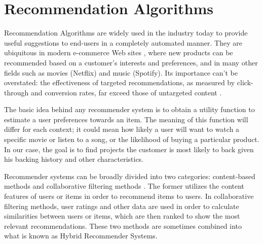 \documentclass[cic,tc,english]{iiufrgs}
\begin{document}



\chapter{Recommendation Algorithms}
Recommendation Algorithms are widely used in the industry today to provide useful suggestions to end-users in a completely automated manner. They are ubiquitous in modern e-commerce Web sites \cite{Schafer2001}, where new products can be recommended based on a customer's interests and preferences, and in many other fields such as movies (Netflix) and music (Spotify). Its importance can't be overstated: the effectiveness of targeted recommendations, as measured by click-through and conversion rates, far exceed those of untargeted content \cite{Linden2003}.

The basic idea behind any recommender system is to obtain a utility function to estimate a user preferences towards an item. The meaning of this function will differ for each context; it could mean how likely a user will want to watch a specific movie or listen to a song, or the likelihood of buying a particular product. In our case, the goal is to find projects the customer is most likely to back given his backing history and other characteristics. 

Recommender systems can be broadly divided into two categories: content-based methods and collaborative filtering methods \cite{Rakesh2016}.
The former utilizes the content features of users or items in order to recommend items to users. In collaborative filtering methods, user ratings and other data are used in order to calculate similarities between users or items, which are then ranked to show the most relevant recommendations. These two methods are sometimes combined into what is known as Hybrid Recommender Systems.
\end{document}
